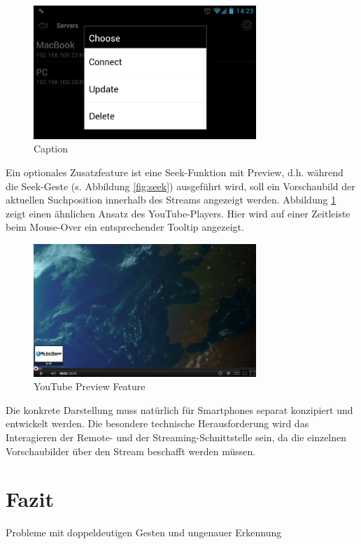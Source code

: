 \documentclass[a4paper,12pt]{article}
\begin{document}
\begin{figure}[H]
\centering
\includegraphics[width=0.75\textwidth]{Screenshot_4.png}
\caption{Caption}
\end{figure}
Ein optionales Zusatzfeature ist eine Seek-Funktion mit Preview, d.h. während die Seek-Geste (s. Abbildung \ref{fig:seek}) ausgeführt wird, soll ein Vorschaubild der aktuellen Suchposition innerhalb des Streams angezeigt werden. Abbildung \ref{fig:youtube} zeigt einen ähnlichen Ansatz des YouTube-Players. Hier wird auf einer Zeitleiste beim Mouse-Over ein entsprechender Tooltip angezeigt.

\begin{figure}[H]
\centering
\includegraphics[width=0.75\textwidth]{youtube.png}
\caption{YouTube Preview Feature}
\label{fig:youtube}
\end{figure}

Die konkrete Darstellung muss natürlich für Smartphones separat konzipiert und entwickelt werden. Die besondere technische Herausforderung wird das Interagieren der Remote- und der Streaming-Schnittstelle sein, da die einzelnen Vorschaubilder über den Stream beschafft werden müssen.

\section{Fazit}
Probleme mit doppeldeutigen Gesten und ungenauer Erkennung

\newpage
{}
\nocite{*}
\printbibliography

\newpage
{}
\listoffigures

\listoftables

\end{document}
